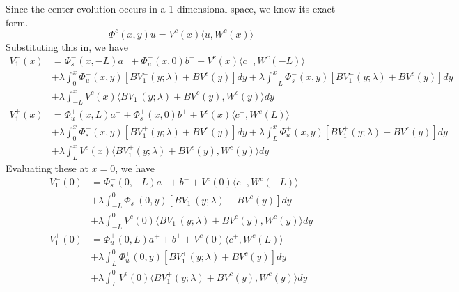 \documentclass[thesis.tex]{subfiles}
\begin{document}
Since the center evolution occurs in a 1-dimensional space, we know its exact form.
\[
\Phi^c(x, y) u = V^c(x)\langle u, W^c(x)\rangle
\]
Substituting this in, we have
\begin{equation*}
\begin{aligned}
V_1^-(x) &= \Phi_s^-(x, -L) a^- + \Phi_u^-(x, 0) b^- + V^c(x)\langle c^-, W^c(-L)\rangle \\
&+ \lambda \int_0^x \Phi_u^-(x, y) [B V_1^-(y; \lambda) + B V^c(y)] dy + \lambda \int_{-L}^x \Phi_s^-(x, y)[B V_1^-(y; \lambda) + B V^c(y)] dy \\
&+ \lambda \int_{-L}^x V^c(x)\langle B V_1^-(y; \lambda) + B V^c(y), W^c(y) \rangle dy \\ 
V_1^+(x) &= \Phi_u^+(x, L) a^+ + \Phi_s^+(x, 0) b^+ + V^c(x)\langle c^+, W^c(L)\rangle \\
&+ \lambda \int_0^x \Phi_s^+(x, y)[B V_1^+(y; \lambda) + B V^c(y)] dy
+ \lambda \int_{L}^x \Phi_u^+(x, y)[B V_1^+(y; \lambda) + B V^c(y)] dy \\
&+ \lambda \int_{L}^x V^c(x) \langle B V_1^+(y; \lambda) + B V^c(y), W^c(y) \rangle  dy
\end{aligned}
\end{equation*}
Evaluating these at $x = 0$, we have
\begin{equation*}
\begin{aligned}
V_1^-(0) &= \Phi_s^-(0, -L) a^- + b^- + V^c(0)\langle c^-, W^c(-L)\rangle \\
&+ \lambda \int_{-L}^0 \Phi_s^-(0, y)[B V_1^-(y; \lambda) + B V^c(y)] dy \\
&+ \lambda \int_{-L}^0 V^c(0)\langle B V_1^-(y; \lambda) + B V^c(y), W^c(y) \rangle dy \\ 
V_1^+(0) &= \Phi_u^+(0, L) a^+ + b^+ + V^c(0)\langle c^+, W^c(L)\rangle \\
&+ \lambda \int_{L}^0 \Phi_u^+(0, y)[B V_1^+(y; \lambda) + B V^c(y)] dy \\
&+ \lambda \int_{L}^0 V^c(0) \langle B V_1^+(y; \lambda) + B V^c(y), W^c(y) \rangle  dy
\end{aligned}
\end{equation*}
\end{document}
